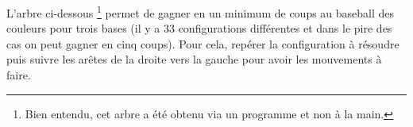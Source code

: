 L'arbre ci-dessous
\footnote{
	Bien entendu, cet arbre a été obtenu via un programme et non à la main.
}
permet de gagner en un minimum de coups au baseball des couleurs pour trois bases (il y a 33 configurations différentes et dans le pire des cas on peut gagner en cinq coups).
Pour cela, repérer la configuration à résoudre puis suivre les arêtes de la droite vers la gauche pour avoir les mouvements à faire.



